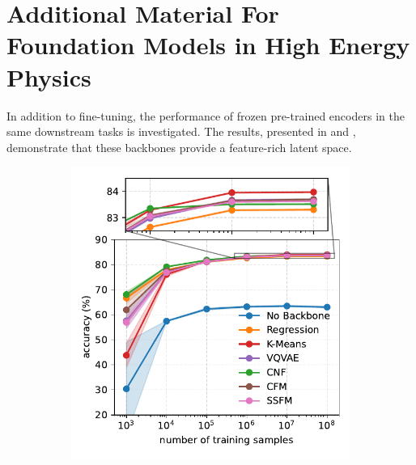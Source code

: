 \chapter{Additional Material For Foundation Models in High Energy Physics}
\label{app:foundation_models}

In addition to fine-tuning, the performance of frozen pre-trained encoders in the same downstream tasks is investigated.
The results, presented in  and , demonstrate that these backbones provide a feature-rich latent space.

\begin{figure}[h!]
    \centering
    \begin{subfigure}{0.32\linewidth}
        \centering
        \includegraphics[width=\linewidth]{Figures/foundation_models/mpm2/final/jetclass_frozen.pdf}
        \caption{}
        \label{fig:jetclass_fixed}
    \end{subfigure}
    \begin{subfigure}[b]{0.32\textwidth}
        \centering

\end{subfigure}
\end{figure}
